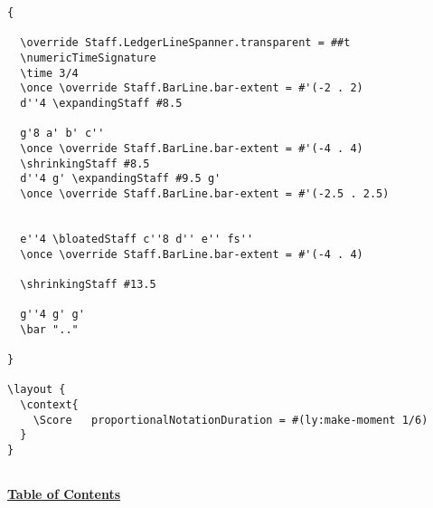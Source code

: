 \begin{verbatim}
{

  \override Staff.LedgerLineSpanner.transparent = ##t
  \numericTimeSignature
  \time 3/4
  \once \override Staff.BarLine.bar-extent = #'(-2 . 2)
  d''4 \expandingStaff #8.5

  g'8 a' b' c''
  \once \override Staff.BarLine.bar-extent = #'(-4 . 4)
  \shrinkingStaff #8.5
  d''4 g' \expandingStaff #9.5 g'
  \once \override Staff.BarLine.bar-extent = #'(-2.5 . 2.5)


  e''4 \bloatedStaff c''8 d'' e'' fs'' 
  \once \override Staff.BarLine.bar-extent = #'(-4 . 4)

  \shrinkingStaff #13.5

  g''4 g' g'
  \bar ".."

}

\layout {
  \context{
    \Score   proportionalNotationDuration = #(ly:make-moment 1/6)
  }
}


\end{verbatim}
\hyperref[sec:toc]{\textbf{Table of Contents}}

\vfill \break


